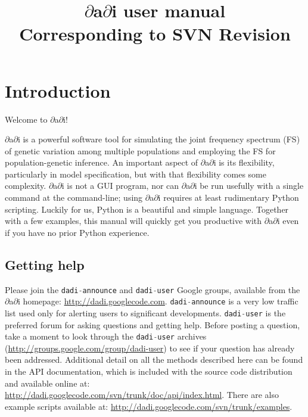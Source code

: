 \documentclass[12pt]{article}
\makeatletter
\newcommand{\dadi}{$\partial$a$\partial$i\xspace}
\newcommand{\py}[1]{\lstinline[language=Python, showstringspaces=False]@#1@}
\makeatother
\begin{document}
\title{\dadi user manual\\\normalsize  Corresponding to SVN $ $Revision$ $}
\date{}
\maketitle

\tableofcontents

\clearpage

\renewcommand*{\lstlistlistingname}{Example code}
\lstlistoflistings

\clearpage

\section{Introduction}

Welcome to \dadi!

\dadi is a powerful software tool for simulating the joint frequency spectrum (FS) of genetic variation among multiple populations and employing the FS for population-genetic inference.
An important aspect of \dadi is its flexibility, particularly in model specification, but with that flexibility comes some complexity.
\dadi is not a GUI program, nor can \dadi be run usefully with a single command at the command-line; using \dadi requires at least rudimentary Python scripting.
Luckily for us, Python is a beautiful and simple language.
Together with a few examples, this manual will quickly get you productive with \dadi even if you have no prior Python experience.

\subsection{Getting help}

Please join the \py{dadi-announce} and \py{dadi-user} Google groups, available from the \dadi homepage: \url{http://dadi.googlecode.com}.
\py{dadi-announce} is a very low traffic list used only for alerting users to significant developments.
\py{dadi-user} is the preferred forum for asking questions and getting help.
Before posting a question, take a moment to look through the \py{dadi-user} archives (\url{http://groups.google.com/group/dadi-user}) to see if your question has already been addressed.
Additional detail on all the methods described here can be found in the API documentation, which is included with the source code distribution and available online at: \url{http://dadi.googlecode.com/svn/trunk/doc/api/index.html}.
There are also example scripts available at: \url{http://dadi.googlecode.com/svn/trunk/examples}.
\end{document}
